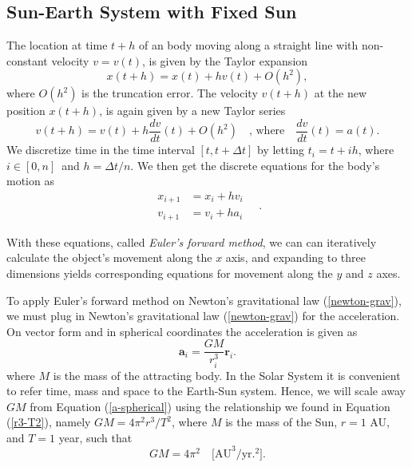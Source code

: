 \documentclass[]{article}
\begin{document}
\subsection{Sun-Earth System with Fixed Sun} \label{sun-earth}
The location at time $t+h$ of an body moving along a straight line with non-constant velocity $v = v(t)$, is given by the Taylor expansion
\begin{equation}
	x(t+h) = x(t) + hv(t) + O(h^2),
\end{equation}
where $O(h^2)$ is the truncation error. The velocity $v(t+h)$ at the new position $x(t+h)$, is again given by a new Taylor series
\begin{equation}
	v(t+h) = v(t) + h \frac{dv}{dt}(t) + O(h^2) \quad \text{, where} \quad \frac{dv}{dt}(t) = a(t).
\end{equation}
We discretize time in the time interval $[t, t + \Delta t]$ by letting $t_i = t + ih$, where $i \in [0,n]$ and $h = \Delta t/n$. We then get the discrete equations for the body's motion as
\begin{equation}
\begin{aligned}
	x_{i+1} &= x_i + hv_i \\
	v_{i+1} &= v_i + ha_i
\end{aligned} \quad.
\end{equation}


With these equations, called \textit{Euler's forward method}, we can can iteratively calculate the object's movement along the $x$ axis, and expanding to three dimensions yields corresponding equations for movement along the $y$ and $z$ axes. 

To apply Euler's forward method on Newton's gravitational law (\ref{newton-grav}), we must plug in Newton's gravitational law (\ref{newton-grav}) for the acceleration. On vector form and in spherical coordinates the acceleration is given as
\begin{equation} \label{a-spherical}
	\mathbf{a}_i = \frac{GM}{r_i^3} \mathbf{r}_i.
\end{equation}
where $M$ is the mass of the attracting body. In the Solar System it is convenient to refer time, mass and space to the Earth-Sun system. Hence, we will scale away $GM$ from Equation (\ref{a-spherical}) using the relationship we found in Equation (\ref{r3-T2}), namely $GM = 4\pi^2r^3/T^2$, where $M$ is the mass of the Sun, $r = 1$ AU, and $T = 1$ year, such that
\begin{equation} \label{a-spherical}
	GM = 4\pi^2 \quad \text{[AU}^3/\text{yr.}^2\text{].}
\end{equation}
\end{document}

